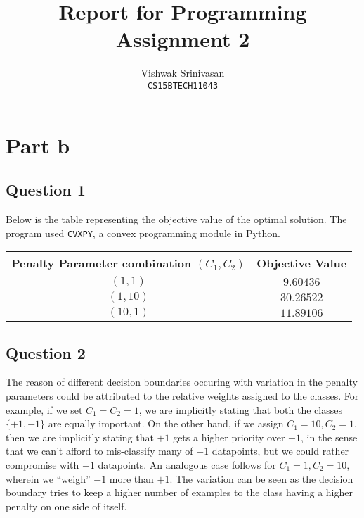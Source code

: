 \documentclass{article}
\title{Report for Programming Assignment 2}
\author{Vishwak Srinivasan\\
\texttt{CS15BTECH11043}}
\date{}
\begin{document}
\maketitle

\section*{Part b}
\subsection*{Question 1}
\begin{flushleft}
Below is the table representing the objective value of the optimal solution. The program used \texttt{CVXPY}, a convex programming module in Python.
\begin{center}
\begin{tabular}{|c|c|}
\hline
Penalty Parameter combination \((C_{1}, C_{2})\) & Objective Value \\
\hline
\hline
\((1, 1)\) & \(9.60436\)\\
\hline
\((1, 10)\) & \(30.26522\)\\
\hline
\((10, 1)\) & \(11.89106\)\\
\hline
\end{tabular}
\end{center}
\end{flushleft}

\subsection*{Question 2}
The reason of different decision boundaries occuring with variation in the penalty parameters could be attributed to the relative weights assigned to the classes. For example, if we set \(C_{1} = C_{2} = 1\), we are implicitly stating that both the classes \(\{+1, -1\}\) are equally important. On the other hand, if we assign \(C_{1} = 10, C_{2} = 1\), then we are implicitly stating that \(+1\) gets a higher priority over \(-1\), in the sense that we can't afford to mis-classify many of \(+1\) datapoints, but we could rather compromise with \(-1\) datapoints. An analogous case follows for \(C_{1} = 1, C_{2} = 10\), wherein we ``weigh'' \(-1\) more than \(+1\). The variation can be seen as the decision boundary tries to keep a higher number of examples to the class having a higher penalty on one side of itself.
\end{document}
